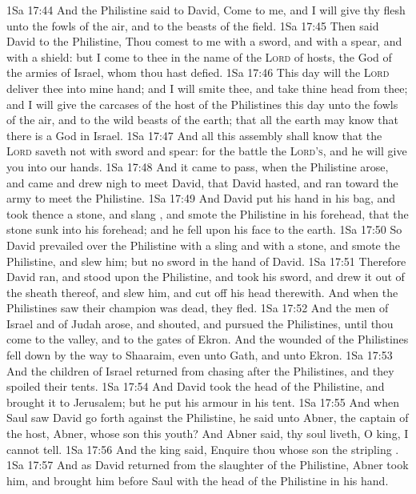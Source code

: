 \vs 1Sa 17:44 And the Philistine said to David, Come to me, and I will give thy flesh unto the fowls of the air, and to the beasts of the field.
\vs 1Sa 17:45 Then said David to the Philistine, Thou comest to me with a sword, and with a spear, and with a shield: but I come to thee in the name of the \textsc{Lord} of hosts, the God of the armies of Israel, whom thou hast defied.
\vs 1Sa 17:46 This day will the \textsc{Lord} deliver thee into mine hand; and I will smite thee, and take thine head from thee; and I will give the carcases of the host of the Philistines this day unto the fowls of the air, and to the wild beasts of the earth; that all the earth may know that there is a God in Israel.
\vs 1Sa 17:47 And all this assembly shall know that the \textsc{Lord} saveth not with sword and spear: for the battle  the \textsc{Lord's}, and he will give you into our hands.
\vs 1Sa 17:48 And it came to pass, when the Philistine arose, and came and drew nigh to meet David, that David hasted, and ran toward the army to meet the Philistine.
\vs 1Sa 17:49 And David put his hand in his bag, and took thence a stone, and slang , and smote the Philistine in his forehead, that the stone sunk into his forehead; and he fell upon his face to the earth.
\vs 1Sa 17:50 So David prevailed over the Philistine with a sling and with a stone, and smote the Philistine, and slew him; but  no sword in the hand of David.
\vs 1Sa 17:51 Therefore David ran, and stood upon the Philistine, and took his sword, and drew it out of the sheath thereof, and slew him, and cut off his head therewith. And when the Philistines saw their champion was dead, they fled.
\vs 1Sa 17:52 And the men of Israel and of Judah arose, and shouted, and pursued the Philistines, until thou come to the valley, and to the gates of Ekron. And the wounded of the Philistines fell down by the way to Shaaraim, even unto Gath, and unto Ekron.
\vs 1Sa 17:53 And the children of Israel returned from chasing after the Philistines, and they spoiled their tents.
\vs 1Sa 17:54 And David took the head of the Philistine, and brought it to Jerusalem; but he put his armour in his tent.
\vs 1Sa 17:55 And when Saul saw David go forth against the Philistine, he said unto Abner, the captain of the host, Abner, whose son  this youth? And Abner said,  thy soul liveth, O king, I cannot tell.
\vs 1Sa 17:56 And the king said, Enquire thou whose son the stripling .
\vs 1Sa 17:57 And as David returned from the slaughter of the Philistine, Abner took him, and brought him before Saul with the head of the Philistine in his hand.
